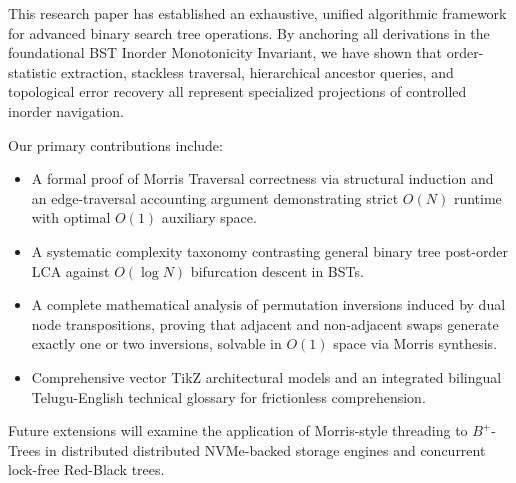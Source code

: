 \documentclass[10pt,twocolumn,letterpaper]{article}
\begin{document}
This research paper has established an exhaustive, unified algorithmic framework for advanced binary search tree operations. By anchoring all derivations in the foundational BST Inorder Monotonicity Invariant, we have shown that order-statistic extraction, stackless traversal, hierarchical ancestor queries, and topological error recovery all represent specialized projections of controlled inorder navigation. 

Our primary contributions include:
\begin{itemize}
    \item A formal proof of Morris Traversal correctness via structural induction and an edge-traversal accounting argument demonstrating strict $O(N)$ runtime with optimal $O(1)$ auxiliary space.
    \item A systematic complexity taxonomy contrasting general binary tree post-order LCA against $O(\log N)$ bifurcation descent in BSTs.
    \item A complete mathematical analysis of permutation inversions induced by dual node transpositions, proving that adjacent and non-adjacent swaps generate exactly one or two inversions, solvable in $O(1)$ space via Morris synthesis.
    \item Comprehensive vector TikZ architectural models and an integrated bilingual Telugu-English technical glossary for frictionless comprehension.
\end{itemize}

Future extensions will examine the application of Morris-style threading to $B^+$-Trees in distributed distributed NVMe-backed storage engines and concurrent lock-free Red-Black trees.

\end{document}
